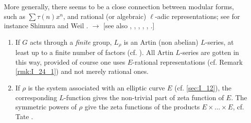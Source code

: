 More generally, there seems to be a close connection between
\dpage
modular forms, such as $\sum \tau(n) x^n$, and rational (or algebraic) $\ell$-adic representations; see for instance Shimura \cite{33} and Weil \cite{45}. $\rightarrow$ [see also \cite{49}, \cite{51}, \cite{65}, \cite{66}, \cite{68}, \cite{84}.]

\begin{ex}
\begin{enumerate}[1.]
	\item If $G$ acts through a \emph{finite} group, $L_\rho$ is an Artin (non abelian) $L$-series, at least up to a finite number of factors (cf. \cite{1}). All Artin $L$-series are gotten in this way, provided of course one uses $E$-rational representations (cf. Remark \ref{rmk:I_24_1}) and not merely rational ones.
	\item If $\rho$ is the system associated with an elliptic curve $E$ (cf. \ref{sec:I_12}), the corresponding $L$-function gives the non-trivial part of zeta function of $E$. The symmetric powers of $\rho$ give the zeta functions of the products $E \times \hdots \times E$, cf. Tate \cite{36}.
\end{enumerate}
\end{ex}

